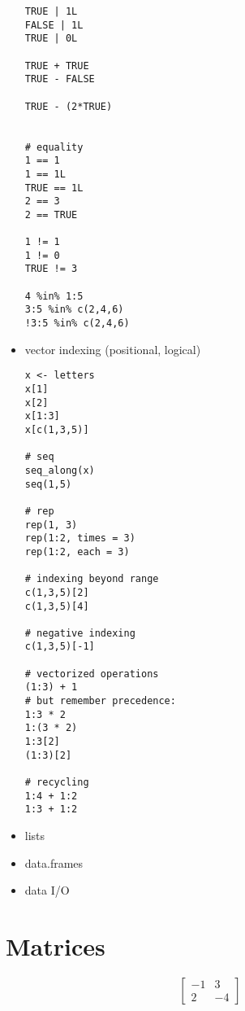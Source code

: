 \documentclass[a4paper,12pt]{article}
\begin{document}
\begin{itemize}
\begin{lstlisting}
TRUE | 1L
FALSE | 1L
TRUE | 0L

TRUE + TRUE
TRUE - FALSE

TRUE - (2*TRUE)


# equality
1 == 1
1 == 1L
TRUE == 1L
2 == 3
2 == TRUE

1 != 1
1 != 0
TRUE != 3

4 %in% 1:5
3:5 %in% c(2,4,6)
!3:5 %in% c(2,4,6)
\end{lstlisting}



\item vector indexing (positional, logical)

\begin{lstlisting}
x <- letters
x[1]
x[2]
x[1:3]
x[c(1,3,5)]

# seq
seq_along(x)
seq(1,5)

# rep
rep(1, 3)
rep(1:2, times = 3)
rep(1:2, each = 3)

# indexing beyond range
c(1,3,5)[2]
c(1,3,5)[4]

# negative indexing
c(1,3,5)[-1]

# vectorized operations
(1:3) + 1
# but remember precedence:
1:3 * 2
1:(3 * 2)
1:3[2]
(1:3)[2]

# recycling
1:4 + 1:2
1:3 + 1:2

\end{lstlisting}


\item lists


\item data.frames


\item data I/O

\end{itemize}



\clearpage
\section{Matrices}

\begin{equation}
\begin{bmatrix}
  -1 & 3 \\
  2 & -4
\end{bmatrix}
\end{equation}


\end{document}
